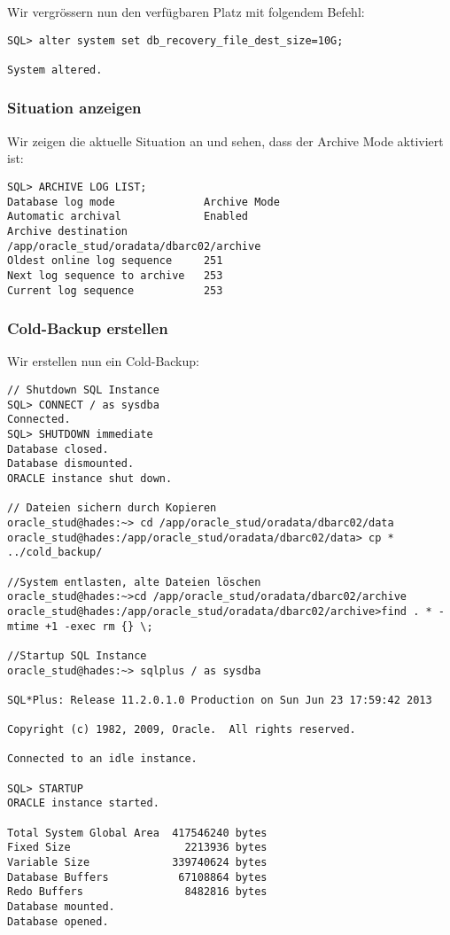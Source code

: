 \documentclass[11pt,a4paper,parskip=half]{scrartcl}
\begin{document}
Wir vergrössern nun den verfügbaren Platz mit folgendem Befehl:
\begin{lstlisting}
SQL> alter system set db_recovery_file_dest_size=10G;

System altered.
\end{lstlisting}

\subsubsection{Situation anzeigen}
Wir zeigen die aktuelle Situation an und sehen, dass der Archive Mode aktiviert ist:
\begin{lstlisting}
SQL> ARCHIVE LOG LIST;
Database log mode              Archive Mode
Automatic archival             Enabled
Archive destination            /app/oracle_stud/oradata/dbarc02/archive
Oldest online log sequence     251
Next log sequence to archive   253
Current log sequence           253
\end{lstlisting}

\subsubsection{Cold-Backup erstellen}
Wir erstellen nun ein Cold-Backup:
\begin{lstlisting}
// Shutdown SQL Instance
SQL> CONNECT / as sysdba
Connected.
SQL> SHUTDOWN immediate
Database closed.
Database dismounted.
ORACLE instance shut down.

// Dateien sichern durch Kopieren
oracle_stud@hades:~> cd /app/oracle_stud/oradata/dbarc02/data
oracle_stud@hades:/app/oracle_stud/oradata/dbarc02/data> cp * ../cold_backup/

//System entlasten, alte Dateien löschen
oracle_stud@hades:~>cd /app/oracle_stud/oradata/dbarc02/archive
oracle_stud@hades:/app/oracle_stud/oradata/dbarc02/archive>find . * -mtime +1 -exec rm {} \;

//Startup SQL Instance
oracle_stud@hades:~> sqlplus / as sysdba

SQL*Plus: Release 11.2.0.1.0 Production on Sun Jun 23 17:59:42 2013

Copyright (c) 1982, 2009, Oracle.  All rights reserved.

Connected to an idle instance.

SQL> STARTUP
ORACLE instance started.

Total System Global Area  417546240 bytes
Fixed Size                  2213936 bytes
Variable Size             339740624 bytes
Database Buffers           67108864 bytes
Redo Buffers                8482816 bytes
Database mounted.
Database opened.
\end{lstlisting}
\end{document}
